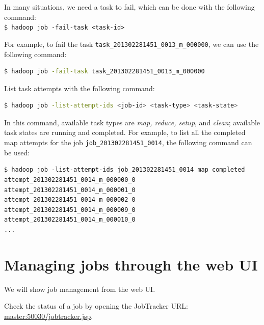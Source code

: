 In many situations, we need a task to fail, which can be done with the following command: \\
\verb|$ hadoop job -fail-task <task-id> |

For example, to fail the task \verb|task_201302281451_0013_m_000000|, we can use the following command:
\lstset{style=bashstyle}
\begin{lstlisting}[language=bash]
$ hadoop job -fail-task task_201302281451_0013_m_000000
\end{lstlisting}

List task attempts with the following command:
\lstset{style=bashstyle}
\begin{lstlisting}[language=bash]
$ hadoop job -list-attempt-ids <job-id> <task-type> <task-state>
\end{lstlisting}

In this command, available task types are \emph{map, reduce, setup}, and \emph{clean}; available task states are running and completed.
For example, to list all the completed map attempts for the job \verb|job_201302281451_0014|, the following command can be used: 
\lstset{style=bashstyle}
\begin{lstlisting}
$ hadoop job -list-attempt-ids job_201302281451_0014 map completed
attempt_201302281451_0014_m_000000_0
attempt_201302281451_0014_m_000001_0
attempt_201302281451_0014_m_000002_0
attempt_201302281451_0014_m_000009_0
attempt_201302281451_0014_m_000010_0
...
\end{lstlisting}

\section{Managing jobs through the web UI}
We will show job management from the web UI.

Check the status of a job by opening the JobTracker URL: \url{master:50030/jobtracker.jsp}.

